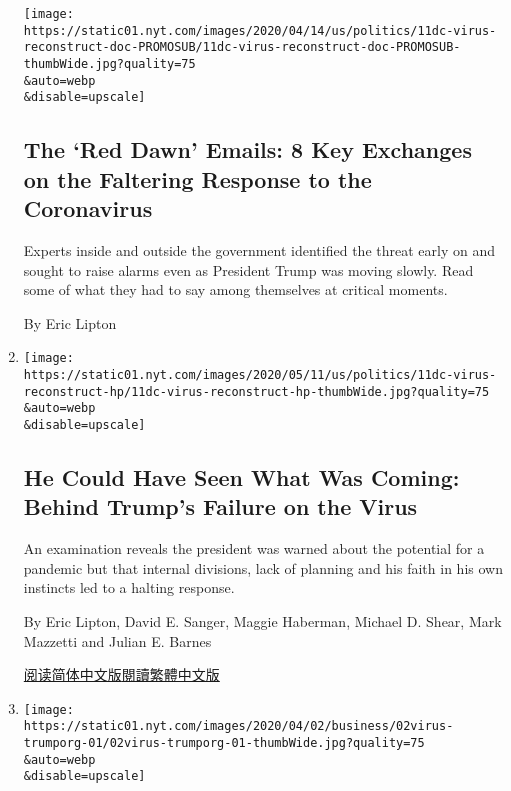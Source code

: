 \begin{enumerate}
  \texttt{[image: https://static01.nyt.com/images/2020/04/14/us/politics/11dc-virus-reconstruct-doc-PROMOSUB/11dc-virus-reconstruct-doc-PROMOSUB-thumbWide.jpg?quality=75\\\&auto=webp\\\&disable=upscale]}

  \hypertarget{the-red-dawn-emails-8-key-exchanges-on-the-faltering-response-to-the-coronavirus}{%
  \subsection{The `Red Dawn' Emails: 8 Key Exchanges on the Faltering
  Response to the
  Coronavirus}\label{the-red-dawn-emails-8-key-exchanges-on-the-faltering-response-to-the-coronavirus}}

  Experts inside and outside the government identified the threat early
  on and sought to raise alarms even as President Trump was moving
  slowly. Read some of what they had to say among themselves at critical
  moments.

  By Eric Lipton
\item
  \href{/2020/04/11/us/politics/coronavirus-trump-response.html}{}

  \texttt{[image: https://static01.nyt.com/images/2020/05/11/us/politics/11dc-virus-reconstruct-hp/11dc-virus-reconstruct-hp-thumbWide.jpg?quality=75\\\&auto=webp\\\&disable=upscale]}

  \hypertarget{he-could-have-seen-what-was-coming-behind-trumps-failure-on-the-virus}{%
  \subsection{He Could Have Seen What Was Coming: Behind Trump's Failure
  on the
  Virus}\label{he-could-have-seen-what-was-coming-behind-trumps-failure-on-the-virus}}

  An examination reveals the president was warned about the potential
  for a pandemic but that internal divisions, lack of planning and his
  faith in his own instincts led to a halting response.

  By Eric Lipton, David E. Sanger, Maggie Haberman, Michael D. Shear,
  Mark Mazzetti and Julian E. Barnes

  \href{https://cn.nytimes.com/usa/20200413/coronavirus-trump-response/}{阅读简体中文版}\href{https://cn.nytimes.com/usa/20200413/coronavirus-trump-response/zh-hant/}{閱讀繁體中文版}
\item
  \href{/2020/04/02/business/economy/coronavirus-trump-company-finances.html}{}

  \texttt{[image: https://static01.nyt.com/images/2020/04/02/business/02virus-trumporg-01/02virus-trumporg-01-thumbWide.jpg?quality=75\\\&auto=webp\\\&disable=upscale]}


\end{enumerate}

